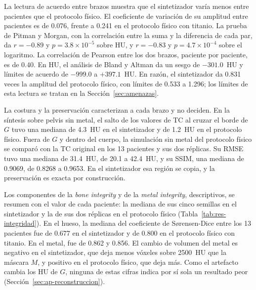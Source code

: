La lectura de acuerdo entre brazos muestra que el sintetizador varía menos entre pacientes que el protocolo físico. El coeficiente de variación de su amplitud entre pacientes es de 0.076, frente a 0.241 en el protocolo físico con titanio. La prueba de Pitman y Morgan, con la correlación entre la suma y la diferencia de cada par, da $r = -0.89$ y $p = 3.8 \times 10^{-5}$ sobre HU, y $r = -0.83$ y $p = 4.7 \times 10^{-4}$ sobre el logaritmo. La correlación de Pearson entre los dos brazos, paciente por paciente, es de 0.40. En HU, el análisis de Bland y Altman da un sesgo de $-301.0$~HU y límites de acuerdo de $-999.0$ a $+397.1$~HU. En razón, el sintetizador da 0.831 veces la amplitud del protocolo físico, con límites de 0.533 a 1.296; los límites de esta lectura se tratan en la Sección~\ref{sec:amenazas}.

La costura y la preservación caracterizan a cada brazo y no deciden. En la síntesis sobre pelvis sin metal, el salto de los valores de TC al cruzar el borde de $G$ tuvo una mediana de 4.3~HU en el sintetizador y de 1.2~HU en el protocolo físico. Fuera de $G$ y dentro del cuerpo, la simulación sin metal del protocolo físico se comparó con la TC original en los 13 pacientes y sus dos réplicas. Su RMSE tuvo una mediana de 31.4~HU, de 20.1 a 42.4~HU, y su SSIM, una mediana de 0.9069, de 0.8268 a 0.9653. En el sintetizador esa región se copia, y la preservación es exacta por construcción.

Los componentes de la \emph{bone integrity} y de la \emph{metal integrity}, descriptivos, se resumen con el valor de cada paciente: la mediana de sus cinco semillas en el sintetizador y la de sus dos réplicas en el protocolo físico (Tabla~\ref{tab:res-integridad}). En el hueso, la mediana del coeficiente de Sørensen-Dice entre los 13 pacientes fue de 0.677 en el sintetizador y de 0.800 en el protocolo físico con titanio. En el metal, fue de 0.862 y 0.856. El cambio de volumen del metal es negativo en el sintetizador, que deja menos vóxeles sobre 2500~HU que la máscara $M$, y positivo en el protocolo físico, que deja más. Como el artefacto cambia los HU de $G$, ninguna de estas cifras indica por sí sola un resultado peor (Sección~\ref{sec:ap-reconstruccion}).

